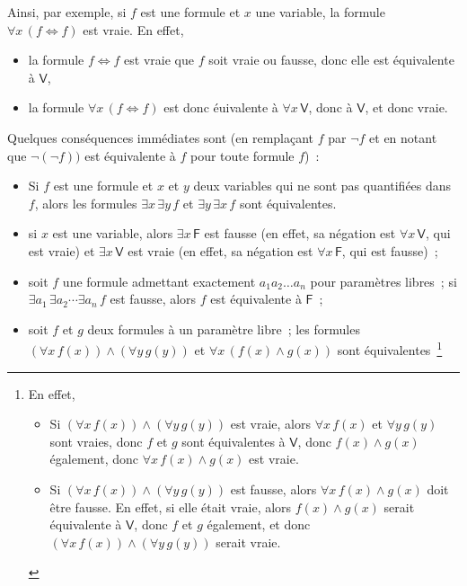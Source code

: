 Ainsi, par exemple, si $f$ est une formule et $x$ une variable, la formule $\forall x \, (f \Leftrightarrow f)$ est vraie. 
En effet, 
\begin{itemize}[nosep]
    \item la formule $f \Leftrightarrow f$ est vraie que $f$ soit vraie ou fausse, donc elle est équivalente à $\mathsf{V}$,
    \item la formule $\forall x \, (f \Leftrightarrow f)$ est donc éuivalente à $\forall x \, \mathsf{V}$, donc à $\mathsf{V}$, et donc vraie.
\end{itemize}

Quelques conséquences immédiates sont (en remplaçant $f$ par $\neg f$ et en notant que $\neg (\neg f))$ est équivalente à $f$ pour toute formule $f$) : 
\begin{itemize}
    \item Si $f$ est une formule et $x$ et $y$ deux variables qui ne sont pas quantifiées dans $f$, alors les formules $\exists x \, \exists y \, f$ et $\exists y \, \exists x \, f$ sont équivalentes.
    \item si $x$ est une variable, alors $\exists x \, \mathsf{F}$ est fausse (en effet, sa négation est $\forall x \, \mathsf{V}$, qui est vraie) et $\exists x \, \mathsf{V}$ est vraie (en effet, sa négation est $\forall x \, \mathsf{F}$, qui est fausse) ; 
    \item soit $f$ une formule admettant exactement $a_1 a_2 \dots a_n$ pour paramètres libres ; si $\exists a_1 \, \exists a_2 \cdots \exists a_n \, f$ est fausse, alors $f$ est équivalente à $\mathsf{F}$ ; 
    \item soit $f$ et $g$ deux formules à un paramètre libre ; les formules $(\forall x \, f(x)) \wedge (\forall y \, g(y))$ et $\forall x \, (f(x) \wedge g(x))$ sont équivalentes~\footnote{
            En effet, 
            \begin{itemize}[nosep]
                \item Si $(\forall x \, f(x)) \wedge (\forall y \, g(y))$ est vraie, alors $\forall x \, f(x)$ et $\forall y \, g(y)$ sont vraies, donc $f$ et $g$ sont équivalentes à $\mathsf{V}$, donc $f(x) \wedge g(x)$ également, donc $\forall x \, f(x) \wedge g(x)$ est vraie.
                \item Si $(\forall x \, f(x)) \wedge (\forall y \, g(y))$ est fausse, alors $\forall x \, f(x) \wedge g(x)$ doit être fausse. 
                    En effet, si elle était vraie, alors $f(x) \wedge g(x)$ serait équivalente à $\mathsf{V}$, donc $f$ et $g$ également, et donc $(\forall x \, f(x)) \wedge (\forall y \, g(y))$ serait vraie.

\end{itemize}}
\end{itemize}
